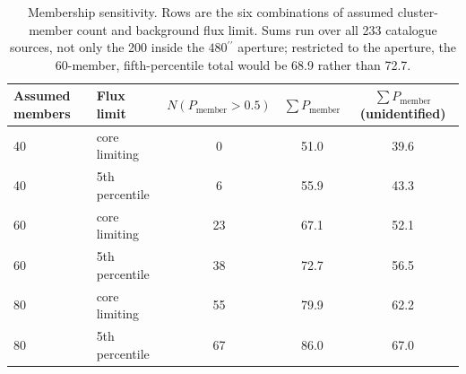 \documentclass[11pt]{article}
\newcommand{\as}{\ensuremath{^{\prime\prime}}}
\begin{document}
\begin{table}[tbp]
\centering
\small
\caption{Membership sensitivity. Rows are the six combinations of assumed cluster-member count and background flux limit. Sums run over all 233 catalogue sources, not only the 200 inside the $480\as$ aperture; restricted to the aperture, the 60-member, fifth-percentile total would be 68.9 rather than 72.7.}
\label{tab:membership}
\begin{tabular}{llccc}
\toprule
Assumed members & Flux limit & $N(P_{\mathrm{member}}>0.5)$ & $\sum P_{\mathrm{member}}$ & $\sum P_{\mathrm{member}}$ (unidentified) \\
\midrule
40 & core limiting  & 0  & 51.0 & 39.6 \\
40 & 5th percentile & 6  & 55.9 & 43.3 \\
60 & core limiting  & 23 & 67.1 & 52.1 \\
60 & 5th percentile & 38 & 72.7 & 56.5 \\
80 & core limiting  & 55 & 79.9 & 62.2 \\
80 & 5th percentile & 67 & 86.0 & 67.0 \\
\bottomrule
\end{tabular}
\end{table}
\end{document}
